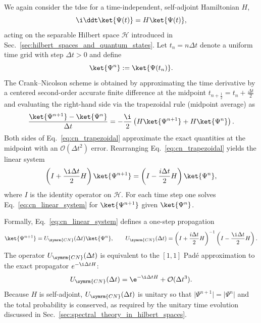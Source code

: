 We again consider the \acrshort{tdse} for a time-independent, self-adjoint Hamiltonian $H$,
\begin{equation}\label{eq:tdse_cn}
\i\ddt\ket{\Psi(t)}=H\ket{\Psi(t)},
\end{equation}
acting on the separable Hilbert space $\mathcal{H}$ introduced in Sec.~\ref{sec:hilbert_spaces_and_quantum_states}. Let $t_n=n\Delta t$ denote a uniform time grid with step $\Delta t>0$ and define
\begin{equation}
\ket{\Psi^n}:=\ket{\Psi(t_n)}.
\end{equation}
The Crank–Nicolson scheme is obtained by approximating the time derivative by a centered second-order accurate finite difference at the midpoint $t_{n+\frac{1}{2}}=t_n+\frac{\Delta t}{2}$ and evaluating the right-hand side via the trapezoidal rule (midpoint average) as
\begin{equation}\label{eq:cn_trapezoidal}
\frac{\ket{\Psi^{n+1}}-\ket{\Psi^n}}{\Delta t}=-\frac{\i}{2}\left(H\ket{\Psi^{n+1}}+H\ket{\Psi^n}\right).
\end{equation}
Both sides of Eq.~\eqref{eq:cn_trapezoidal} approximate the exact quantities at the midpoint
with an $\mathcal{O}(\Delta t^2)$ error. Rearranging Eq.~\eqref{eq:cn_trapezoidal} yields the linear system
\begin{equation}\label{eq:cn_linear_system}
\left(I+\frac{\i\Delta t}{2}H\right)\ket{\Psi^{n+1}}=\left(I-\frac{i\Delta t}{2}H\right)\ket{\Psi^n},
\end{equation}
where $I$ is the identity operator on $\mathcal{H}$. For each time step one solves Eq.~\eqref{eq:cn_linear_system} for $\ket{\Psi^{n+1}}$ given $\ket{\Psi^n}$.

Formally, Eq.~\eqref{eq:cn_linear_system} defines a one-step propagation
\begin{equation}\label{eq:cn_propagator_operator}
\ket{\Psi^{n+1}}=U_{\symrm{CN}}(\Delta t)\ket{\Psi^n},\qquad U_{\symrm{CN}}(\Delta t)=\left(I+\frac{i\Delta t}{2}H\right)^{-1}\left(I-\frac{\i\Delta t}{2}H\right).
\end{equation}
The operator $U_{\symrm{CN}}(\Delta t)$ is equivalent to the $[1,1]$ Padé approximation to the exact propagator $e^{-\i\Delta t H}$:
\begin{equation}
U_{\symrm{CN}}(\Delta t)=\e^{-\i\Delta t H}+\mathcal{O}(\Delta t^3).
\end{equation}
Because $H$ is self-adjoint, $U_{\symrm{CN}}(\Delta t)$ is unitary so that $\lvert\Psi^{n+1}\rvert=\lvert\Psi^n\rvert$ and the total probability is conserved, as required by the unitary time evolution discussed in Sec.~\ref{sec:spectral_theory_in_hilbert_spaces}.
